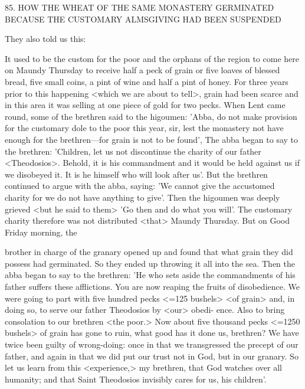 85.
HOW THE WHEAT OF THE SAME MONASTERY
GERMINATED BECAUSE THE CUSTOMARY
ALMSGIVING HAD BEEN SUSPENDED

They also told us this:

It used to be the custom for the poor and the orphans of the region
to come here on Maundy Thursday to receive half a peck of grain
or five loaves of blessed bread, five small coins, a pint of wine and
half a pint of honey.
For three years prior to this happening <which
we are about to tell>, grain had been scarce and in this area it was
selling at one piece of gold for two pecks.
When Lent came round,
some of the brethren said to the higoumen: 'Abba, do not make
provision for the customary dole to the poor this year, sir, lest the
monastery not have enough for the brethren—for grain is not to be
found', The abba began to say to the brethren: 'Children, let us not
discontinue the charity of our father <Theodosios>.
Behold, it is his
commandment and it would be held against us if we disobeyed it.
It is he himself who will look after us'.
But the brethren continued
to argue with the abba, saying: 'We cannot give the accustomed
charity for we do not have anything to give'.
Then the higoumen
was deeply grieved <but he said to them> 'Go then and do what
you will'.
The customary charity therefore was not distributed
<that> Maundy Thursday.
But on Good Friday morning, the

brother in charge of the granary opened up and found that what
grain they did possess had germinated.
So they ended up throwing
it all into the sea.
Then the abba began to say to the brethren: 'He
who sets aside the commandments of his father suffers these
afflictions.
You are now reaping the fruits of disobedience.
We were
going to part with five hundred pecks <=125 bushels> <of grain>
and, in doing so, to serve our father Theodosios by <our> obedi-
ence.
Also to bring consolation to our brethren <the poor.> Now
about five thousand pecks <=1250 bushels> of grain has gone to
ruin, what good has it done us, brethren? We have twice been guilty
of wrong-doing: once in that we transgressed the precept of our
father, and again in that we did put our trust not in God, but in our
granary.
So let us learn from this <experience,> my brethren, that
God watches over all humanity; and that Saint Theodosios invisibly
cares for us, his children'.

